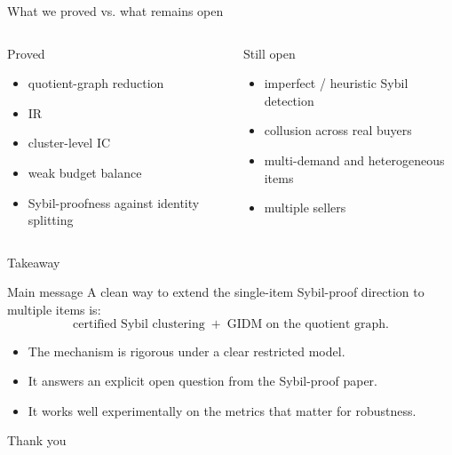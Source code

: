 \documentclass[aspectratio=169]{beamer}
\begin{document}
\begin{frame}{What we proved vs. what remains open}
\begin{columns}[T]
\begin{block}{Proved}
\begin{itemize}
    \item quotient-graph reduction
    \item IR
    \item cluster-level IC
    \item weak budget balance
    \item Sybil-proofness against identity splitting
\end{itemize}
\end{block}

\begin{alertblock}{Still open}
\begin{itemize}
    \item imperfect / heuristic Sybil detection
    \item collusion across real buyers
    \item multi-demand and heterogeneous items
    \item multiple sellers
\end{itemize}
\end{alertblock}
\end{columns}
\end{frame}

\begin{frame}{Takeaway}
\begin{block}{Main message}
A clean way to extend the single-item Sybil-proof direction to multiple items is:
\[
\text{certified Sybil clustering} \;+\; \text{GIDM on the quotient graph}.
\]
\end{block}

\begin{itemize}
    \item The mechanism is rigorous under a clear restricted model.
    \item It answers an explicit open question from the Sybil-proof paper.
    \item It works well experimentally on the metrics that matter for robustness.
\end{itemize}

\vspace{0.6em}
\centering
{\Large Thank you}
\end{frame}
\end{document}
